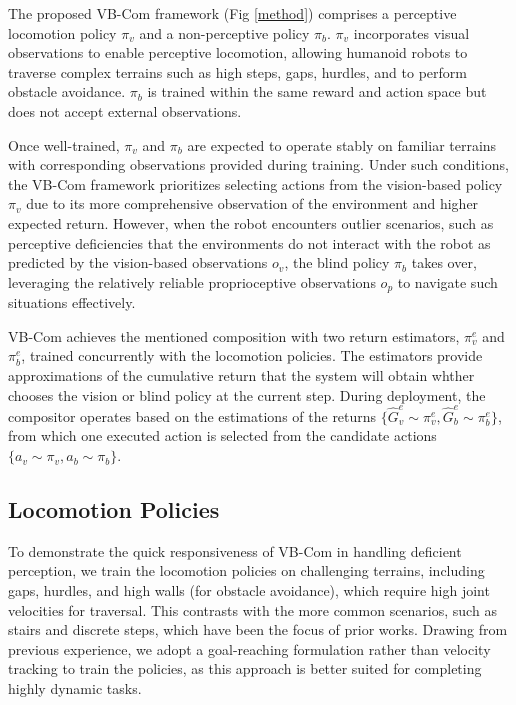 The proposed VB-Com framework (Fig \ref{method}) comprises a perceptive locomotion policy $\pi_v$ and a non-perceptive policy $\pi_b$. $\pi_v$ incorporates visual observations to enable perceptive locomotion, allowing humanoid robots to traverse complex terrains such as high steps, gaps, hurdles, and to perform obstacle avoidance. $\pi_b$ is trained within the same reward and action space but does not accept external observations.

Once well-trained, $\pi_v$ and $\pi_b$ are expected to operate stably on familiar terrains with corresponding observations provided during training. Under such conditions, the VB-Com framework prioritizes selecting actions from the vision-based policy $\pi_v$ due to its more comprehensive observation of the environment and higher expected return. However, when the robot encounters outlier scenarios, such as perceptive deficiencies that the environments do not interact with the robot as predicted by the vision-based observations $o_v$, the blind policy $\pi_b$ takes over, leveraging the relatively reliable proprioceptive observations $o_p$ to navigate such situations effectively.

VB-Com achieves the mentioned composition with two return estimators, $\pi_v^e$ and $\pi_b^e$, trained concurrently with the locomotion policies. The estimators provide approximations of the cumulative return that the system will obtain whther chooses the vision or blind policy at the current step. During deployment, the compositor operates based on the estimations of the returns $\{\hat{G}^e_v \sim \pi_v^e, \hat{G}^e_b \sim \pi_b^e \}$, from which one executed action is selected from the candidate actions $\{a_v \sim \pi_v, a_b \sim \pi_b \}$.
 
\subsection{Locomotion Policies}

To demonstrate the quick responsiveness of VB-Com in handling deficient perception, we train the locomotion policies on challenging terrains, including gaps, hurdles, and high walls (for obstacle avoidance), which require high joint velocities for traversal. This contrasts with the more common scenarios, such as stairs and discrete steps, which have been the focus of prior works. Drawing from previous experience, we adopt a goal-reaching formulation rather than velocity tracking to train the policies, as this approach is better suited for completing highly dynamic tasks.

